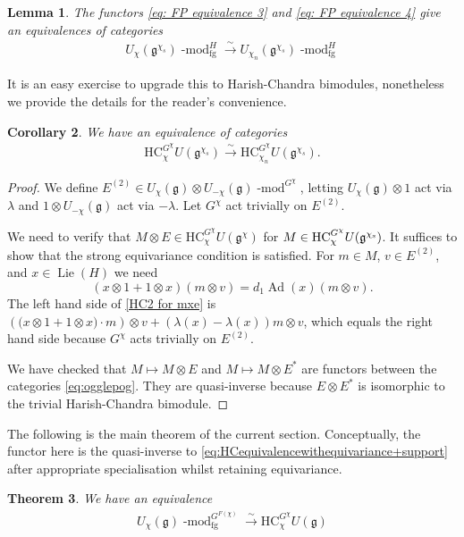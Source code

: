 \documentclass[twoside,12pt,reqno]{amsart}
\newtheorem{Theorem}{Theorem}[section]
\newtheorem{Lemma}[Theorem]{Lemma}
\newtheorem{Corollary}[Theorem]{Corollary}
\theoremstyle{remark}
\numberwithin{equation}{section}
\def\isoto{\overset{\sim}{\longrightarrow}}
\def\rs{{\mathrm s}}
\def\lmod{\!\operatorname{-mod}}
\def\Lie{\operatorname{Lie}}
\def\Ad{\operatorname{Ad}}
\def\HC{\mathrm{HC}}
\def\g{{\mathfrak g}}
\newcommand{\fg}{\operatorname{fg}}
\renewcommand{\rs}{{\rm s}}
\begin{document}
\begin{Lemma} \label{thm: FP nilpotent reduction}
    The functors \eqref{eq: FP equivalence 3} and \eqref{eq: FP equivalence 4} give an equivalences of categories \begin{eqnarray}
    \label{eq: FP nilpotent reduction}
        U_\chi(\g^{\chi_s}) \lmod^{H}_{\fg}\isoto U_{\chi_n}(\g^{\chi_s}) \lmod^{H}_{\fg}
    \end{eqnarray}
\end{Lemma}

It is an easy exercise to upgrade this to Harish-Chandra bimodules, nonetheless we provide the details for the reader's convenience.

\begin{Corollary}\label{c:HCtwist}
    We have an equivalence of categories
    \begin{eqnarray}
    \label{eq:ogglepog}
        \HC^{G^\chi}_{\chi} U(\g^{\chi_s}) \isoto \HC^{G^\chi}_{\chi_n} U(\g^{\chi_s}).
    \end{eqnarray}
\end{Corollary}

\begin{proof}
    We define $E^{(2)} \in U_\chi(\g) \otimes U_{-\chi}(\g)\lmod^{G^\chi}$, letting $U_\chi(\g) \otimes 1$ act via $\lambda$ and $1\otimes U_{-\chi}(\g)$ act via $-\lambda$. Let $G^\chi$ act trivially on $E^{(2)}$.
    
    We need to verify that $M \otimes E \in \HC_\chi^{G^\chi} U(\g^\chi)$ for $M \in \HC_\chi^{G^\chi} U(\g^{\chi_\rs})$. It suffices to show that the strong equivariance condition is satisfied. For $m \in M$, $v \in E^{(2)}$, and $x \in \Lie(H)$ we need
    \begin{equation} \label{HC2 for mxe}
    (x \otimes 1 + 1 \otimes x) (m \otimes v) = d_1 \Ad(x) (m \otimes v).
    \end{equation}
    The left hand side of \eqref{HC2 for mxe} is $(\big(x\otimes 1 + 1\otimes x\big)\cdot m ) \otimes v + (\lambda(x) - \lambda(x)) m\otimes v$, which equals the right hand side because $G^\chi$ acts trivially on $E^{(2)}$.

    We have checked that $M \mapsto M \otimes E$ and $M \mapsto M\otimes E^*$ are functors between the categories \eqref{eq:ogglepog}. They are quasi-inverse because $E \otimes E^*$ is isomorphic to the trivial Harish-Chandra bimodule.
\end{proof}

    The following is the main theorem of the current section. Conceptually, the functor here is the quasi-inverse to \eqref{eq:HCequivalencewithequivariance+support} after appropriate specialisation whilst retaining equivariance.
\begin{Theorem} \label{thm: GF(X) equivariance}
    We have an equivalence
    \begin{eqnarray}
    \label{eq:thm GF(X) equivariance}
        U_\chi(\g) \lmod^{G^{F(\chi)}}_{\fg}\isoto\HC_\chi^{G^\chi} U(\g)
    \end{eqnarray}
\end{Theorem}
\end{document}
